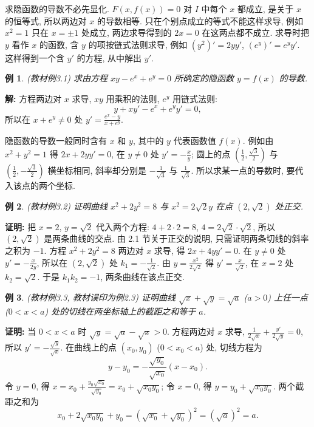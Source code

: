 \documentclass[UTF8,openany]{ctexbook}
\theoremstyle{chinesetextbook}
\newtheorem{example}{例}[section]
\newenvironment{cnproof}{\par\indent\textbf{证明:} \ignorespaces}{\par}
\newenvironment{cnsolution}{\par\indent\textbf{解:} \ignorespaces}{\par}
\begin{document}
求隐函数的导数不必先显化. $F(x,f(x))=0$ 对 $I$ 中每个 $x$ 都成立, 是关于 $x$ 的恒等式, 所以两边对 $x$ 的导数相等. 只在个别点成立的等式不能这样求导, 例如 $x^2=1$ 只在 $x=\pm1$ 处成立, 两边求导得到的 $2x=0$ 在这两点都不成立. 求导时把 $y$ 看作 $x$ 的函数, 含 $y$ 的项按链式法则求导, 例如 $(y^2)'=2yy'$, $(e^y)'=e^yy'$. 这样得到一个含 $y'$ 的方程, 从中解出 $y'$.
\begin{example}\label{ex:c2-3-1}
\textnormal{(教材例3.1)} 求由方程 $xy-e^x+e^y=0$ 所确定的隐函数 $y=f(x)$ 的导数.
\end{example}
\begin{cnsolution}
方程两边对 $x$ 求导, $xy$ 用乘积的法则, $e^y$ 用链式法则:
\[
y+xy'-e^x+e^yy'=0,
\]
所以在 $x+e^y\ne0$ 处 $\displaystyle y'=\frac{e^x-y}{x+e^y}$.
\end{cnsolution}
隐函数的导数一般同时含有 $x$ 和 $y$, 其中的 $y$ 代表函数值 $f(x)$. 例如由 $x^2+y^2=1$ 得 $2x+2yy'=0$, 在 $y\ne0$ 处 $\displaystyle y'=-\frac xy$; 圆上的点 $\displaystyle\left(\frac12,\frac{\sqrt3}2\right)$ 与 $\displaystyle\left(\frac12,-\frac{\sqrt3}2\right)$ 横坐标相同, 斜率却分别是 $\displaystyle-\frac1{\sqrt3}$ 与 $\displaystyle\frac1{\sqrt3}$. 所以求某一点的导数时, 要代入该点的两个坐标.
\begin{example}\label{ex:c2-3-2}
\textnormal{(教材例3.2)} 证明曲线 $x^2+2y^2=8$ 与 $x^2=2\sqrt2y$ 在点 $(2,\sqrt2)$ 处正交.
\end{example}
\begin{cnproof}
把 $x=2$, $y=\sqrt2$ 代入两个方程: $4+2\cdot2=8$, $4=2\sqrt2\cdot\sqrt2$, 所以 $(2,\sqrt2)$ 是两条曲线的交点. 由 2.1 节关于正交的说明, 只需证明两条切线的斜率之积为 $-1$. 方程 $x^2+2y^2=8$ 两边对 $x$ 求导, 得 $2x+4yy'=0$. 在 $y\ne0$ 处 $\displaystyle y'=-\frac x{2y}$, 所以在 $(2,\sqrt2)$ 处 $\displaystyle k_1=-\frac1{\sqrt2}$. 由 $\displaystyle y=\frac{x^2}{2\sqrt2}$ 得 $\displaystyle y'=\frac x{\sqrt2}$, 在 $x=2$ 处 $k_2=\sqrt2$. 于是 $k_1k_2=-1$, 两条曲线在该点正交.
\end{cnproof}
\begin{example}\label{ex:c2-3-3}
\textnormal{(教材例3.3, 教材误印为例2.3)} 证明曲线 $\sqrt x+\sqrt y=\sqrt a$ ($a>0$) 上任一点 ($0<x<a$) 处的切线在两坐标轴上的截距之和等于 $a$.
\end{example}
\begin{cnproof}
当 $0<x<a$ 时 $\sqrt y=\sqrt a-\sqrt x>0$. 方程两边对 $x$ 求导, $\displaystyle\frac1{2\sqrt x}+\frac{y'}{2\sqrt y}=0$, 所以 $\displaystyle y'=-\frac{\sqrt y}{\sqrt x}$. 在曲线上的点 $(x_0,y_0)$ ($0<x_0<a$) 处, 切线方程为
\[
y-y_0=-\frac{\sqrt{y_0}}{\sqrt{x_0}}(x-x_0).
\]
令 $y=0$, 得 $\displaystyle x=x_0+\frac{y_0\sqrt{x_0}}{\sqrt{y_0}}=x_0+\sqrt{x_0y_0}$; 令 $x=0$, 得 $y=y_0+\sqrt{x_0y_0}$. 两个截距之和为
\[
x_0+2\sqrt{x_0y_0}+y_0=\left(\sqrt{x_0}+\sqrt{y_0}\right)^2=\left(\sqrt a\right)^2=a.
\]
\end{cnproof}
\end{document}
